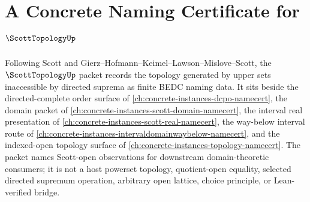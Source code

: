 \chapter{A Concrete Naming Certificate for $\ScottTopologyUp$}
\label{ch:concrete-instances-scott-topology-namecert}

Following Scott and Gierz--Hofmann--Keimel--Lawson--Mislove--Scott, the $\ScottTopologyUp$ packet records the topology generated by upper sets inaccessible by directed suprema as finite BEDC naming data. It sits beside the directed-complete order surface of \autoref{ch:concrete-instances-dcpo-namecert}, the domain packet of \autoref{ch:concrete-instances-scott-domain-namecert}, the interval real presentation of \autoref{ch:concrete-instances-scott-real-namecert}, the way-below interval route of \autoref{ch:concrete-instances-intervaldomainwaybelow-namecert}, and the indexed-open topology surface of \autoref{ch:concrete-instances-topology-namecert}. The packet names Scott-open observations for downstream domain-theoretic consumers; it is not a host powerset topology, quotient-open equality, selected directed supremum operation, arbitrary open lattice, choice principle, or Lean-verified bridge.

